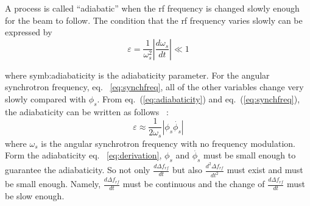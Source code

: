 \begin{itemize}
A process is called “adiabatic” when the rf frequency is changed slowly enough for the beam to follow. The condition that the rf frequency varies slowly can be expressed by 
\begin{equation}
\varepsilon=\frac{1}{\omega_s^2}|\frac{d\omega_s}{dt}| \ll 1
\label{eq:adiabaticity}
\end{equation} 

where \gls{symb:adiabaticity} is the adiabaticity parameter. For the angular synchrotron frequency, eq. ~\ref{eq:synchfreq}, all of the other variables change very slowly compared with $\phi_s$. From eq.~(\ref{eq:adiabaticity}) and eq.~(\ref{eq:synchfreq}), the adiabaticity can be written as follows ~\cite{ezura_beam-dynamics_2008}:
\begin{equation}
\varepsilon \approx \frac{1}{2\omega_s}|\phi_s\dot{\phi_{s}}|
\label{eq:derivation}
\end{equation} 
where $\omega_s$ is the angular synchrotron frequency with no frequency modulation. Form the adiabaticity eq. ~\ref{eq:derivation}, $\phi_{s}$ and $\dot{\phi_{s}}$ must be small enough to guarantee the adiabaticity. So not only $\frac{d\Delta f_{\mathit{rf}}}{dt}$ but also $\frac{d^2\Delta f_{\mathit{rf}}}{dt^2}$ must exist and must be small enough. Namely, $\frac{d\Delta f_{\mathit{rf}}}{dt}$ must be continuous and the change of $\frac{d\Delta f_{\mathit{rf}}}{dt}$ must be slow enough. 

%
%



\end{itemize}
